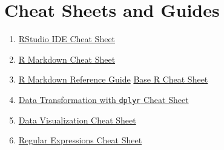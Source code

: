 \documentclass[]{book}
\begin{document}
\chapter{Cheat Sheets and Guides}\label{cheat-sheets-and-guides}

\begin{enumerate}
\def\labelenumi{\arabic{enumi}.}
\item
  \href{https://github.com/rstudio/cheatsheets/raw/master/rstudio-ide.pdf}{RStudio
  IDE Cheat Sheet}
\item
  \href{https://github.com/rstudio/cheatsheets/raw/master/rmarkdown-2.0.pdf}{R
  Markdown Cheat Sheet}
\item
  \href{https://www.rstudio.com/wp-content/uploads/2015/03/rmarkdown-reference.pdf}{R
  Markdown Reference Guide}
  \href{http://github.com/rstudio/cheatsheets/raw/master/base-r.pdf}{Base
  R Cheat Sheet}
\item
  \href{https://github.com/rstudio/cheatsheets/raw/master/data-transformation.pdf}{Data
  Transformation with \texttt{dplyr} Cheat Sheet}
\item
  \href{https://github.com/rstudio/cheatsheets/raw/master/data-visualization-2.1.pdf}{Data
  Visualization Cheat Sheet}
\item
  \href{https://github.com/rstudio/cheatsheets/raw/master/regex.pdf}{Regular
  Expressions Cheat Sheet}
\end{enumerate}
\end{document}

